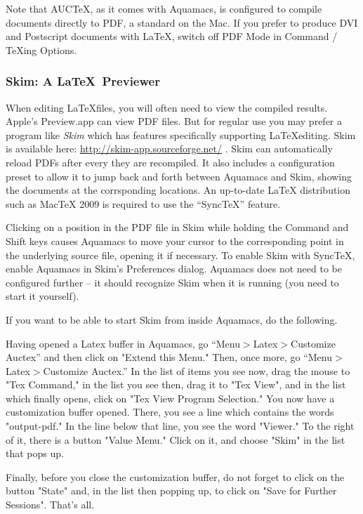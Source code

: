 \documentclass[11pt,letterpaper]{article}
\begin{document}
Note that AUCTeX, as it comes with Aquamacs, is configured to compile documents directly to PDF, a standard on the Mac. If you prefer to produce DVI and Postscript documents with LaTeX, switch off PDF Mode in Command / TeXing Options.



\subsubsection{Skim: A   \LaTeX\ Previewer}

When editing \LaTeX files, you will often need to view the compiled results. Apple's Preview.app can view PDF files. But for regular use you may prefer a program like \emph{Skim} which has features specifically supporting \LaTeX editing.  Skim is available here:  \url{http://skim-app.sourceforge.net/} .  Skim can automatically reload PDFs after every they are recompiled. It also includes a configuration preset to allow it to jump back and forth between Aquamacs and Skim, showing the documents at the corrsponding locations.  An up-to-date LaTeX distribution such as MacTeX 2009 is required to use the ``SyncTeX'' feature.  

Clicking on a position in the PDF file in Skim while holding the
Command and Shift keys causes Aquamacs to move your cursor to the
corresponding point in the underlying source file, opening it if
necessary. To enable Skim with SyncTeX, enable Aquamacs in Skim's
Preferences dialog.  Aquamacs does not need to be configured further
-- it should recognize Skim when it is running (you need to start it
yourself).

If you want to be able to  start Skim  from inside Aquamacs, do the following.

  Having opened a Latex buffer in Aquamacs, go
  ``Menu$>$Latex$>$Customize Auctex'' and then click on "Extend this Menu."
  Then, once more, go ``Menu$>$Latex$>$Cust\-omize Auctex.'' In the list of
  items you see now, drag the mouse to "Tex Command," in the list you
  see then, drag it to "Tex View", and in the list which finally
  opens, click on "Tex View Program Selection." You now have a
  customization buffer opened. There, you see a line which contains
  the words "output-pdf." In the line below that line, you see the
  word "Viewer." To the right of it, there is a button "Value Menu."
  Click on it, and choose "Skim" in the list that pops up.

Finally, before you close the customization buffer, do not forget to click on the button "State" and, in the list then popping up, to click on "Save for Further Sessions". That's all.
\end{document}
